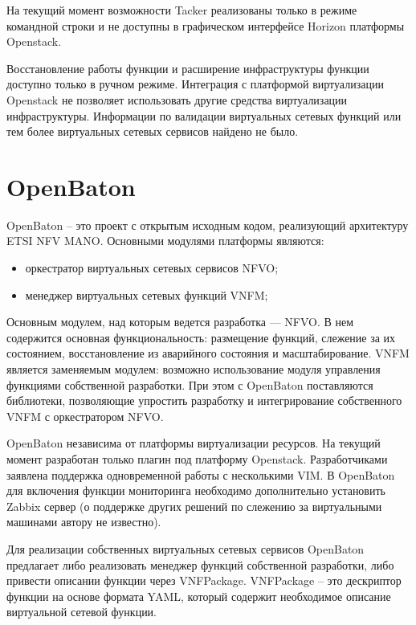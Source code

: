 \documentclass[oneside,final,14pt,a4paper]{extreport}
\begin{document}
На текущий момент возможности Tacker реализованы только в режиме командной строки и не доступны в графическом интерфейсе Horizon платформы Openstack.

Восстановление работы функции и расширение инфраструктуры функции доступно только в ручном режиме. Интеграция с платформой виртуализации Openstack не позволяет использовать другие средства виртуализации инфраструктуры. Информации по валидации виртуальных сетевых функций или тем более виртуальных сетевых сервисов найдено не было.


\section{OpenBaton}
OpenBaton\cite{bib:openbaton} -- это проект с открытым исходным кодом, реализующий архитектуру ETSI NFV MANO. Основными модулями платформы являются:
\begin{itemize}
	\item оркестратор виртуальных сетевых сервисов NFVO;
	\item менеджер виртуальных сетевых функций VNFM;
\end{itemize}

Основным модулем, над которым ведется разработка --- NFVO. В нем содержится основная функциональность: размещение функций, слежение за их состоянием, восстановление из аварийного состояния и масштабирование. VNFM является заменяемым модулем: возможно использование модуля управления функциями собственной разработки. При этом с OpenBaton поставляются библиотеки, позволяющие упростить разработку и интегрирование собственного VNFM с оркестратором NFVO.

OpenBaton независима от платформы виртуализации ресурсов. На текущий момент разработан только плагин под платформу Openstack. Разработчиками заявлена поддержка одновременной работы с несколькими VIM. В OpenBaton для включения функции мониторинга необходимо дополнительно установить Zabbix сервер (о поддержке других решений по слежению за виртуальными машинами автору не известно).


Для реализации собственных виртуальных сетевых сервисов OpenBaton предлагает либо реализовать менеджер функций собственной разработки, либо привести описании функции через VNFPackage. VNFPackage -- это дескриптор функции на основе формата YAML, который содержит необходимое описание виртуальной сетевой функции.
\end{document}
